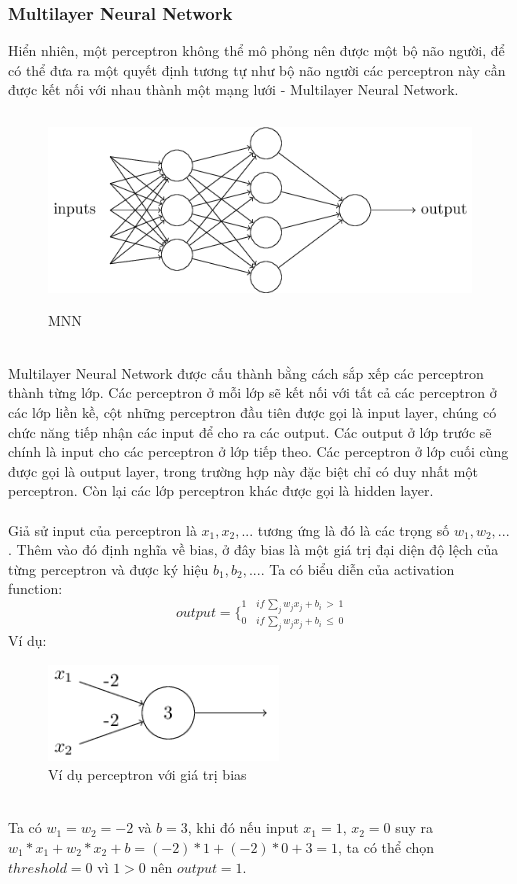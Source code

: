\subsubsection{Multilayer Neural Network}
Hiển nhiên, một perceptron không thể mô phỏng nên được một bộ não người, để 
có thể đưa ra một quyết định tương tự như bộ não người các perceptron này cần 
được kết nối với nhau thành một mạng lưới - Multilayer Neural Network.\\
\begin{figure}[h!]
\centering
\includegraphics[height=2in, keepaspectratio=true]{multilayerneuralnetwork.png}
\caption{MNN}
\end{figure}\\
Multilayer Neural Network được cấu thành bằng cách sắp xếp các perceptron thành 
từng lớp. Các perceptron ở mỗi lớp sẽ kết nối với tất cả các perceptron ở các 
lớp liền kề, cột những perceptron đầu tiên được gọi là input layer, chúng có 
chức năng tiếp nhận các input để cho ra các output. Các output ở lớp trước sẽ chính là 
input cho các perceptron ở lớp tiếp theo. Các perceptron ở lớp cuối cùng được gọi là 
output layer, trong trường hợp này đặc biệt chỉ có duy nhất một perceptron. Còn 
lại các lớp perceptron khác được gọi là hidden layer.\\\\
Giả sử input của perceptron là $x_1, x_2, ...$ tương ứng là đó là các trọng 
số $w_1, w_2, ...$. Thêm vào đó định nghĩa về bias, ở đây bias là một giá trị 
đại diện độ lệch của từng perceptron và được ký hiệu $b_1, b_2, ...$. Ta có biểu diễn của activation 
function:\\
\[
  output = 
  \bigg\{
    _{0 \quad if \, \sum_j w_j x_j + b_i\, \leq \, 0}
    ^{1 \quad if \, \sum_j w_j x_j + b_i\, > \, 1}
\]
Ví dụ:\\
\begin{figure}[h!]
\centering
\includegraphics[height=1in, keepaspectratio=true]{exmln.png}
\caption{Ví dụ perceptron với giá trị bias}
\end{figure}\\
Ta có $w_1=w_2=-2$ và $b=3$, khi đó nếu input $x_1=1,\, x_2=0$ suy ra $ 
w_1*x_1+w_2*x_2+b=(-2)*1+(-2)*0+3=1$, ta có thể chọn $threshold=0$ vì $1>0$
nên $output=1$.


